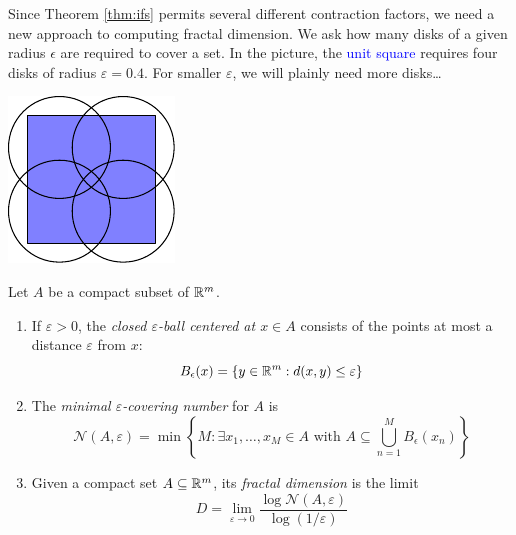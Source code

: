 \begin{minipage}[t]{0.8\linewidth}\vspace{0pt}
	
	Since Theorem \ref{thm:ifs} permits several different contraction factors, we need a new approach to computing fractal dimension. We ask how many disks of a given radius $\epsilon$ are required to cover a set. In the picture, the \textcolor{blue}{unit square} requires four disks of radius $\varepsilon=0.4$. For smaller $\varepsilon$, we will plainly need more disks\ldots
\end{minipage}
\hfill
\begin{minipage}[t]{0.19\linewidth}\vspace{0pt}
	\flushright\includegraphics{epsiloncover}
\end{minipage}


\begin{defn}{}{}
	Let $A$ be a compact subset of $\mathbb{R}^m$.
	\begin{enumerate}
	  \item If $\varepsilon>0$, the \emph{closed $\varepsilon$-ball centered at $x\in A$} consists of the points at most a distance $\varepsilon$ from $x$:
		\[
			B_\epsilon(x)=\{y\in\mathbb{R}^m:d(x,y)\le\varepsilon\}
		\]
		\item The \emph{minimal $\varepsilon$-covering number} for $A$ is
		\[
			\mathcal N(A,\varepsilon)=\min\left\{M:\exists x_1,\ldots,x_M\in A\text{ with }A\subseteq \bigcup\limits_{n=1}^MB_\epsilon(x_n)\right\}
		\]
		
		\item Given a compact set $A\subseteq\mathbb{R}^m$, its \emph{fractal dimension} is the limit
		\[
			D=\lim_{\varepsilon\to 0}\frac{\log\mathcal N(A,\varepsilon)}{\log (1/\varepsilon)}
		\]
	\end{enumerate}
\end{defn}

